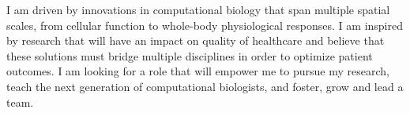 \break
\begin{cvparagraph}
\par
{I am driven by innovations in computational biology that span multiple spatial scales, from cellular function to whole-body physiological responses. I am inspired by research that will have an impact on quality of healthcare and believe that these solutions must bridge multiple disciplines in order to optimize patient outcomes. I am looking for a role that will empower me to pursue my research, teach the next generation of computational biologists, and foster, grow and lead a team. }
\end{cvparagraph}